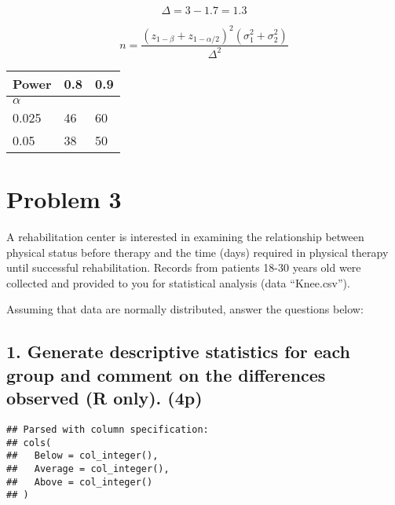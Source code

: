 \documentclass[]{article}
\newenvironment{Shaded}{\begin{snugshade}}{\end{snugshade}}
\newcommand{\KeywordTok}[1]{\textcolor[rgb]{0.13,0.29,0.53}{\textbf{#1}}}
\newcommand{\StringTok}[1]{\textcolor[rgb]{0.31,0.60,0.02}{#1}}
\newcommand{\OperatorTok}[1]{\textcolor[rgb]{0.81,0.36,0.00}{\textbf{#1}}}
\newcommand{\NormalTok}[1]{#1}
\begin{document}
\[
\Delta = 3-1.7=1.3
\]

\[
n = \frac{(z_{1-\beta} + z_{1-\alpha /2})^{2}(\sigma_{1}^{2}+\sigma_{2}^{2})}{\Delta ^{2}}
\]

\begin{longtable}[]{@{}lll@{}}
\toprule
Power & 0.8 & 0.9\tabularnewline
\midrule
\endhead
\(\alpha\) & &\tabularnewline
0.025 & 46 & 60\tabularnewline
0.05 & 38 & 50\tabularnewline
\bottomrule
\end{longtable}

\section{Problem 3}\label{problem-3}

A rehabilitation center is interested in examining the relationship
between physical status before therapy and the time (days) required in
physical therapy until successful rehabilitation. Records from patients
18-30 years old were collected and provided to you for statistical
analysis (data ``Knee.csv'').

Assuming that data are normally distributed, answer the questions below:

\subsection{1. Generate descriptive statistics for each group and
comment on the differences observed (R only).
(4p)}\label{generate-descriptive-statistics-for-each-group-and-comment-on-the-differences-observed-r-only.-4p}

\begin{Shaded}
\end{Shaded}

\begin{verbatim}
## Parsed with column specification:
## cols(
##   Below = col_integer(),
##   Average = col_integer(),
##   Above = col_integer()
## )
\end{verbatim}

\begin{Shaded}
\end{Shaded}
\end{document}
